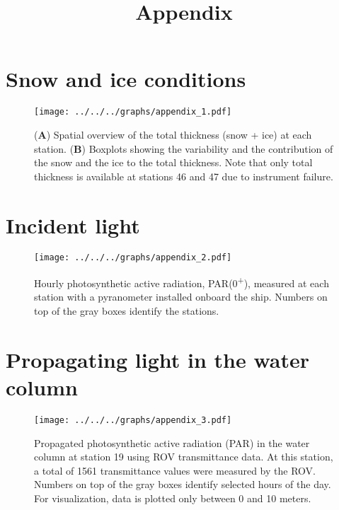 \documentclass[12pt,a4paper]{scrartcl}
\title{Appendix}
\date{}
\begin{document}
\maketitle

\section*{Snow and ice conditions}

\begin{figure}[h]
	\centering
	\texttt{[image: ../../../graphs/appendix\_1.pdf]}
	\caption{(\textbf{A}) Spatial overview of the total thickness (snow + ice) at each station. (\textbf{B}) Boxplots showing the variability and the contribution of the snow and the ice to the total thickness. Note that only total thickness is available at stations 46 and 47 due to instrument failure.}
\end{figure}

\clearpage
\newpage

\section*{Incident light}

\begin{figure}[h]
	\centering
	\texttt{[image: ../../../graphs/appendix\_2.pdf]}
	\caption{Hourly photosynthetic active radiation, PAR(0\textsuperscript{+}), measured at each station with a pyranometer installed onboard the ship. Numbers on top of the gray boxes identify the stations.}
\end{figure}

\clearpage
\newpage

\section*{Propagating light in the water column}

\begin{figure}[h]
	\centering
	\texttt{[image: ../../../graphs/appendix\_3.pdf]}
	\caption{Propagated photosynthetic active radiation (PAR) in the water column at station 19 using ROV transmittance data. At this station, a total of 1561 transmittance values were measured by the ROV. Numbers on top of the gray boxes identify selected hours of the day. For visualization, data is plotted only between 0 and 10 meters.}
\end{figure}

\clearpage
\newpage
\end{document}
